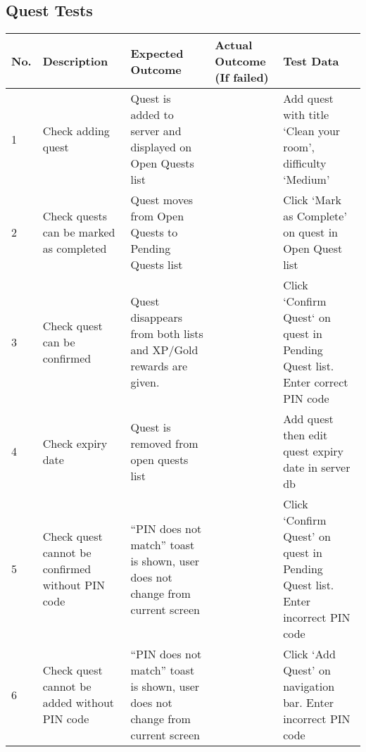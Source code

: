 \begin{landscape}
\section{Quest Tests}
\begin{tabularx}{\linewidth}{p{1cm} X X X X}
\textbf{No.} & \textbf{Description}                    & \textbf{Expected Outcome}                                  	& \textbf{Actual Outcome (If failed)} & \textbf{Test Data}                                          \\ \hline
1            & Check adding quest                               & Quest is added to server and displayed on Open Quests list                         &                                                                  & Add quest with title `Clean your room', difficulty `Medium'                    \\ \hline
2            & Check quests can be marked as completed          & Quest moves from Open Quests to Pending Quests list                                &                                                                  & Click `Mark as Complete' on quest in Open Quest list                           \\ \hline
3            & Check quest can be confirmed                     & Quest disappears from both lists and XP/Gold rewards are given.                    &                                                                  & Click `Confirm Quest` on quest in Pending Quest list. Enter correct PIN code   \\ \hline
4            & Check expiry date                                & Quest is removed from open quests list                                             &                                                                  & Add quest then edit quest expiry date in server db                             \\ \hline
5            & Check quest cannot be confirmed without PIN code & ``PIN does not match'' toast is shown, user does not change from current screen    &                                                                  & Click `Confirm Quest' on quest in Pending Quest list. Enter incorrect PIN code \\ \hline
6            & Check quest cannot be added without PIN code     & ``PIN does not match'' toast is shown, user does not change from current screen    &                                                                  & Click `Add Quest' on navigation bar. Enter incorrect PIN code                  \\ \hline

\end{tabularx}
\end{landscape}
